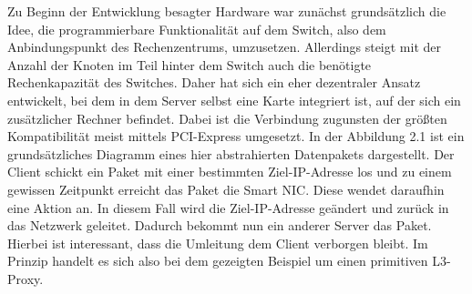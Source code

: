 Zu Beginn der Entwicklung besagter Hardware war zunächst grundsätzlich die Idee, die programmierbare Funktionalität auf dem Switch, also dem Anbindungspunkt des Rechenzentrums, umzusetzen. Allerdings steigt mit der Anzahl der Knoten im Teil hinter dem Switch auch die benötigte Rechenkapazität des Switches. \cite{smartswitches} Daher hat sich ein eher dezentraler Ansatz entwickelt, bei dem in dem Server selbst eine Karte integriert ist, auf der sich ein zusätzlicher Rechner befindet. Dabei ist die Verbindung zugunsten der größten Kompatibilität meist mittels PCI-Express umgesetzt. In der Abbildung 2.1 ist ein grundsätzliches Diagramm eines hier abstrahierten Datenpakets dargestellt. Der Client schickt ein Paket mit einer bestimmten Ziel-IP-Adresse los und zu einem gewissen Zeitpunkt erreicht das Paket die Smart NIC. Diese wendet daraufhin eine Aktion an. In diesem Fall wird die Ziel-IP-Adresse geändert und zurück in das Netzwerk geleitet. Dadurch bekommt nun ein anderer Server das Paket. Hierbei ist interessant, dass die Umleitung dem Client verborgen bleibt. Im Prinzip handelt es sich also bei dem gezeigten Beispiel um einen primitiven L3-Proxy.
